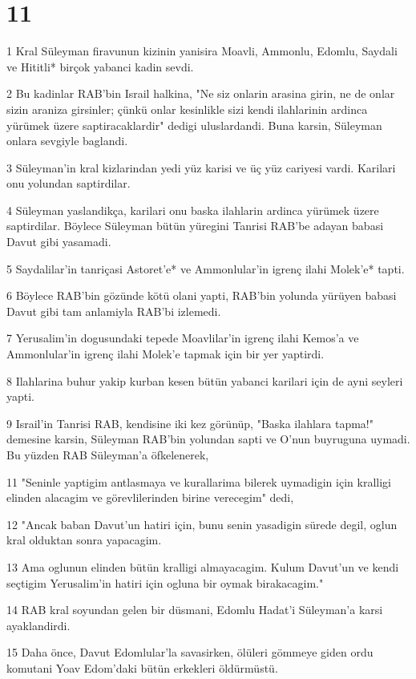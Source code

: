 \chapter{11}

\par 1 Kral Süleyman firavunun kizinin yanisira Moavli, Ammonlu, Edomlu, Saydali ve Hititli* birçok yabanci kadin sevdi.
\par 2 Bu kadinlar RAB'bin Israil halkina, "Ne siz onlarin arasina girin, ne de onlar sizin araniza girsinler; çünkü onlar kesinlikle sizi kendi ilahlarinin ardinca yürümek üzere saptiracaklardir" dedigi uluslardandi. Buna karsin, Süleyman onlara sevgiyle baglandi.
\par 3 Süleyman'in kral kizlarindan yedi yüz karisi ve üç yüz cariyesi vardi. Karilari onu yolundan saptirdilar.
\par 4 Süleyman yaslandikça, karilari onu baska ilahlarin ardinca yürümek üzere saptirdilar. Böylece Süleyman bütün yüregini Tanrisi RAB'be adayan babasi Davut gibi yasamadi.
\par 5 Saydalilar'in tanriçasi Astoret'e* ve Ammonlular'in igrenç ilahi Molek'e* tapti.
\par 6 Böylece RAB'bin gözünde kötü olani yapti, RAB'bin yolunda yürüyen babasi Davut gibi tam anlamiyla RAB'bi izlemedi.
\par 7 Yerusalim'in dogusundaki tepede Moavlilar'in igrenç ilahi Kemos'a ve Ammonlular'in igrenç ilahi Molek'e tapmak için bir yer yaptirdi.
\par 8 Ilahlarina buhur yakip kurban kesen bütün yabanci karilari için de ayni seyleri yapti.
\par 9 Israil'in Tanrisi RAB, kendisine iki kez görünüp, "Baska ilahlara tapma!" demesine karsin, Süleyman RAB'bin yolundan sapti ve O'nun buyruguna uymadi. Bu yüzden RAB Süleyman'a öfkelenerek,
\par 11 "Seninle yaptigim antlasmaya ve kurallarima bilerek uymadigin için kralligi elinden alacagim ve görevlilerinden birine verecegim" dedi,
\par 12 "Ancak baban Davut'un hatiri için, bunu senin yasadigin sürede degil, oglun kral olduktan sonra yapacagim.
\par 13 Ama oglunun elinden bütün kralligi almayacagim. Kulum Davut'un ve kendi seçtigim Yerusalim'in hatiri için ogluna bir oymak birakacagim."
\par 14 RAB kral soyundan gelen bir düsmani, Edomlu Hadat'i Süleyman'a karsi ayaklandirdi.
\par 15 Daha önce, Davut Edomlular'la savasirken, ölüleri gömmeye giden ordu komutani Yoav Edom'daki bütün erkekleri öldürmüstü.
